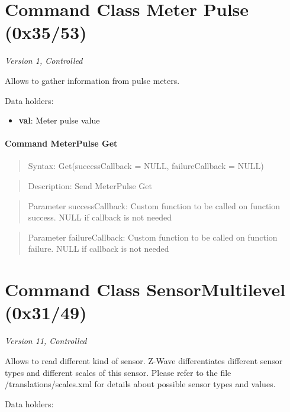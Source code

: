 \section{Command Class Meter Pulse (0x35/53)}

\textit{Version 1, Controlled}
\newline

Allows to gather information from pulse meters.
\newline

\noindent
Data holders:

\begin{itemize}
\item \textbf{val}: Meter pulse value
\end{itemize}

\paragraph{Command MeterPulse Get}
\begin{quote}Syntax: Get(successCallback = NULL, failureCallback = NULL)\end{quote}
\begin{quote}Description: Send MeterPulse Get\end{quote}
\begin{quote}Parameter successCallback: Custom function to be called on function success. NULL if callback is not needed\end{quote}
\begin{quote}Parameter failureCallback: Custom function to be called on function failure. NULL if callback is not needed\end{quote}



\section{Command Class SensorMultilevel (0x31/49)}

\textit{Version 11, Controlled}
\newline

Allows to read different kind of sensor. Z-Wave differentiates different sensor types and different scales of this sensor. Please refer to the file /translations/scales.xml for details about possible sensor types and values.
\newline

\noindent
Data holders:


